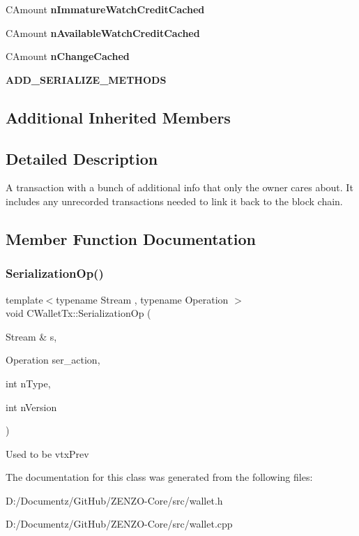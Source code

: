 \begin{DoxyCompactItemize}
\mbox{\label{class_c_wallet_tx_afe7b93d5672df90c6b1d3065dc047fe0}} 
C\+Amount {\bfseries n\+Immature\+Watch\+Credit\+Cached}
\item 
\mbox{\label{class_c_wallet_tx_ab3113c0543c6f68ccbb2449dde29aec7}} 
C\+Amount {\bfseries n\+Available\+Watch\+Credit\+Cached}
\item 
\mbox{\label{class_c_wallet_tx_af324c0c303c44aea9c790e782187343e}} 
C\+Amount {\bfseries n\+Change\+Cached}
\item 
\mbox{\label{class_c_wallet_tx_aad8df774858ddd54f06a76eb075f2823}} 
{\bfseries A\+D\+D\+\_\+\+S\+E\+R\+I\+A\+L\+I\+Z\+E\+\_\+\+M\+E\+T\+H\+O\+DS}
\end{DoxyCompactItemize}
\subsection*{Additional Inherited Members}


\subsection{Detailed Description}
A transaction with a bunch of additional info that only the owner cares about. It includes any unrecorded transactions needed to link it back to the block chain. 

\subsection{Member Function Documentation}
\mbox{\label{class_c_wallet_tx_a94e65d0105f2a75a627e374b0bbefe06}} 
\subsubsection{\texorpdfstring{SerializationOp()}{SerializationOp()}}
{\footnotesize\ttfamily template$<$typename Stream , typename Operation $>$ \\
void C\+Wallet\+Tx\+::\+Serialization\+Op (\begin{DoxyParamCaption}\item[{Stream \&}]{s,  }\item[{Operation}]{ser\+\_\+action,  }\item[{int}]{n\+Type,  }\item[{int}]{n\+Version }\end{DoxyParamCaption})\hspace{0.3cm}{\ttfamily [inline]}}

Used to be vtx\+Prev 

The documentation for this class was generated from the following files\+:\begin{DoxyCompactItemize}
\item 
D\+:/\+Documentz/\+Git\+Hub/\+Z\+E\+N\+Z\+O-\/\+Core/src/wallet.\+h\item 
D\+:/\+Documentz/\+Git\+Hub/\+Z\+E\+N\+Z\+O-\/\+Core/src/wallet.\+cpp\end{DoxyCompactItemize}
